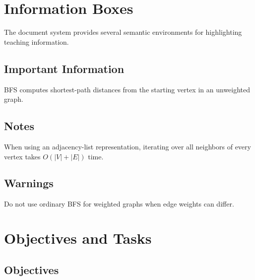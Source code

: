 \documentclass{csdept}
\begin{document}
\section{Information Boxes}

The document system provides several semantic environments for
highlighting teaching information.

\subsection{Important Information}

\begin{important}

BFS computes shortest-path distances from the starting vertex
in an unweighted graph.

\end{important}

\subsection{Notes}

\begin{note}

When using an adjacency-list representation, iterating over all
neighbors of every vertex takes $O(|V|+|E|)$ time.

\end{note}

\subsection{Warnings}

\begin{warning}

Do not use ordinary BFS for weighted graphs when edge weights
can differ.

\end{warning}

\section{Objectives and Tasks}

\subsection{Objectives}
\end{document}
